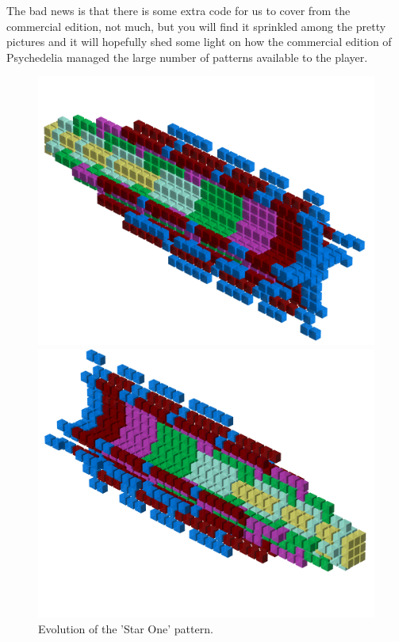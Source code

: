The bad news is that there is some extra code for us to cover from the commercial edition, not much,
but you will find it sprinkled among the pretty pictures and it will hopefully shed some light
on how the commercial edition of Psychedelia managed the large number of patterns available to the
player.

\clearpage
\begin{figure}[H]
    \centering
    \begin{adjustbox}{width=12cm,center}
      \includegraphics[width=12cm]{src/patterns/pattern0-45.png}%
    \end{adjustbox}
    \begin{adjustbox}{width=12cm,margin=0cm -2cm}
      \includegraphics[width=12cm]{src/patterns/pattern0-225.png}%
    \end{adjustbox}
\caption{Evolution of the 'Star One' pattern.}
\end{figure}

